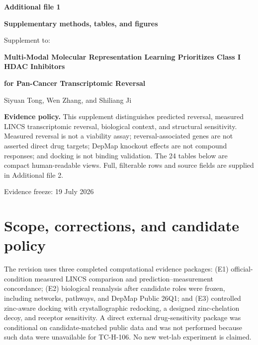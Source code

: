 \documentclass[10pt]{article}
\begin{document}
\begin{titlepage}
\centering
{\Large\bfseries Additional file 1\par}
\vspace{0.35cm}
{\LARGE\bfseries Supplementary methods, tables, and figures\par}
\vspace{0.8cm}
{\large Supplement to:\par}
\vspace{0.2cm}
{\Large\bfseries Multi-Modal Molecular Representation Learning Prioritizes Class I HDAC Inhibitors\par}
{\Large\bfseries for Pan-Cancer Transcriptomic Reversal\par}
\vspace{0.8cm}
{\large Siyuan Tong, Wen Zhang, and Shiliang Ji\par}
\vfill
\begin{minipage}{0.88\textwidth}
\small
\textbf{Evidence policy.} This supplement distinguishes predicted reversal, measured LINCS transcriptomic reversal, biological context, and structural sensitivity. Measured reversal is not a viability assay; reversal-associated genes are not asserted direct drug targets; DepMap knockout effects are not compound responses; and docking is not binding validation. The 24 tables below are compact human-readable views. Full, filterable rows and source fields are supplied in Additional file 2.
\end{minipage}
\vfill
{\large Evidence freeze: 19 July 2026\par}
\end{titlepage}

\tableofcontents
\clearpage

\section{Scope, corrections, and candidate policy}

The revision uses three completed computational evidence packages: (E1) official-condition measured LINCS comparison and prediction--measurement concordance; (E2) biological reanalysis after candidate roles were frozen, including networks, pathways, and DepMap Public 26Q1; and (E3) controlled zinc-aware docking with crystallographic redocking, a designed zinc-chelation decoy, and receptor sensitivity. A direct external drug-sensitivity package was conditional on candidate-matched public data and was not performed because such data were unavailable for TC-H-106. No new wet-lab experiment is claimed.
\end{document}

